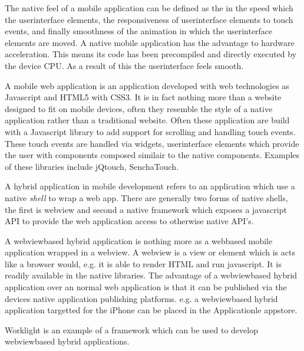 
The native feel of a mobile application can be defined as the in the speed which the userinterface elements, the responsiveness of userinterface elements to touch events, and finally smoothness of the animation in which the userinterface elements are moved.
A native mobile application has the advantage to hardware acceleration. This means its code has been precompiled and directly executed by the device CPU. As a result of this the userinterface feels smooth.
 	

A mobile web application is an application developed with web technologies as Javascript and HTML5 with CSS3. It is in fact nothing more than a website designed to fit on mobile devices, often they resemble the style of a native application rather than a traditional website. Often these application are build with a Javascript library to add support for scrolling and handling touch events. These touch events are handled via widgets, userinterface elements which provide the user with components composed similair to the native components. Examples of these libraries include jQtouch, SenchaTouch.


A hybrid application in mobile development refers to an application which use a native \emph{shell} to wrap a web app. There are generally two forms of native shells,  the first is  webview and second a native framework which exposes a javascript API to provide the web application access to otherwise native API's.

A webviewbased hybrid application is nothing more as a webbased mobile application wrapped in a webview. A webview is a view or element which is acts like a browser would, e.g. it is able to render HTML and run javascript.  It is readily available in the native libraries. The advantage of a webviewbased hybrid application over an normal web application is that it can be published via the devices native application publishing platforms. e.g. a webviewbased hybrid application targetted for the iPhone can be placed in the Applicationle appstore. 

Worklight is an example of a framework which can be used to develop webviewbased hybrid applications.


